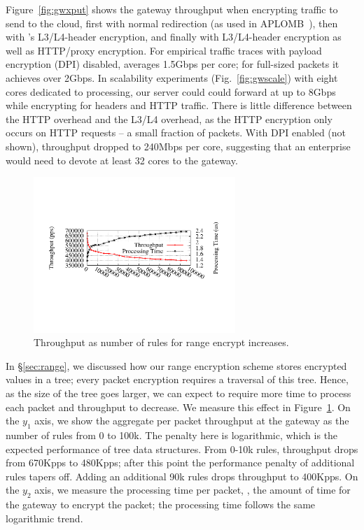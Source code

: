 
Figure~\ref{fig:gwxput} shows the gateway throughput when encrypting traffic to send to the cloud, first with normal redirection (as used in APLOMB~\cite{aplomb}), then with \sys's L3/L4-header encryption, and finally with L3/L4-header encryption as well as HTTP/proxy encryption. 
For empirical traffic traces with payload encryption (DPI) disabled, \sys averages 1.5Gbps per core; for full-sized packets it achieves over 2Gbps.
In scalability experiments (Fig.~\ref{fig:gwscale}) with eight cores dedicated to processing, our server could could forward at up to 8Gbps while encrypting for headers and HTTP traffic.
There is little difference between the HTTP overhead and the L3/L4 overhead, as the HTTP encryption only occurs on HTTP requests -- a small fraction of packets. 
With DPI enabled (not shown), throughput dropped to 240Mbps per core, suggesting that an enterprise would need to devote at least 32 cores to the gateway.

\begin{figure}[t]
  \centering
  \includegraphics[width=3in]{fig/xputrange}
  \caption[]{\label{fig:xputrange} Throughput as number of rules for range encrypt increases.}
\end{figure}

In \S\ref{sec:range}, we discussed how our range encryption scheme stores encrypted values in a tree; every packet encryption requires a traversal of this tree.
Hence, as the size of the tree goes larger, we can expect to require more time to process each packet and throughput to decrease.
We measure this effect in Figure~\ref{fig:xputrange}. 
On the $y_1$ axis, we show the aggregate per packet throughput at the gateway as the number of rules from 0 to 100k. The penalty here is logarithmic, which is the expected performance of tree data structures. From 0-10k rules, throughput drops from 670Kpps to 480Kpps; after this point the performance penalty of additional rules tapers off. Adding an additional 90k rules drops throughput to 400Kpps.
On the $y_2$ axis, we measure the processing time per packet, \ie{}, the amount of time for the gateway to encrypt the packet; the processing time follows the same logarithmic trend.

